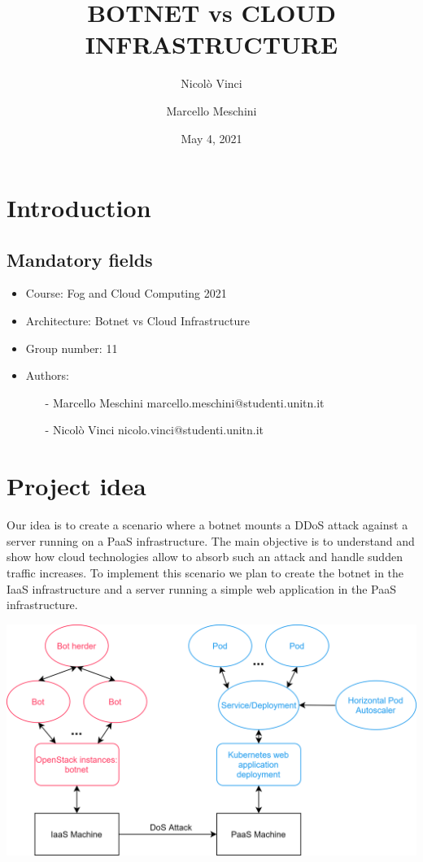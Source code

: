 \documentclass{article}
\title{BOTNET vs CLOUD INFRASTRUCTURE}
\author{Nicolò Vinci  \\
	\and 
	Marcello Meschini \\
	}
\date{May 4, 2021}
\begin{document}
\maketitle

\section{Introduction}
\label{intro}

\subsection{Mandatory fields}
\label{mfields}

\begin{itemize}
\item Course: Fog and Cloud Computing 2021
\item Architecture: Botnet vs Cloud Infrastructure
\item Group number: 11
\item Authors:

\begin{itemize}
\item[-] Marcello Meschini marcello.meschini@studenti.unitn.it
\item[-] Nicolò Vinci nicolo.vinci@studenti.unitn.it
\end{itemize}

\end{itemize}

\section{Project idea} 
\label{idea}
Our idea is to create a scenario where a botnet mounts a DDoS attack against a server running on a PaaS infrastructure. The main objective is to understand and show how cloud technologies allow to absorb such an attack and handle sudden traffic increases. 
To implement this scenario we plan to create the botnet in the IaaS infrastructure and a server running a simple web application in the PaaS infrastructure.

\begin{center}
	\includegraphics[scale=0.8]{schema.png}
    	\label{fig:schema}
\end{center}
\end{document}
